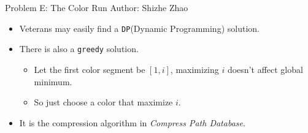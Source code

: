 \begin{frame}{Problem E: The Color Run}
\small Author: Shizhe Zhao

\begin{itemize}
\item<1-> Veterans may easily find a \texttt{DP}(Dynamic Programming) solution.
\item<1-> There is also a \texttt{greedy} solution.
  \begin{itemize}
    \item<2-> Let the first color segment be $[1, i]$, maximizing $i$ doesn't affect global minimum.
    \item<3-> So just choose a color that maximize $i$.
  \end{itemize}
\item<4-> It is the compression algorithm in \textit{Compress Path Database}.
\end{itemize}
\end{frame}
